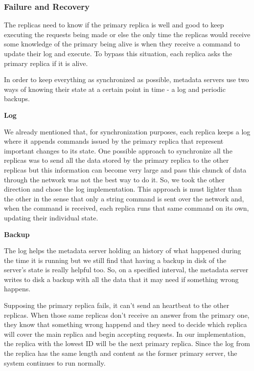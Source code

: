 \subsubsection{Failure and Recovery}

The replicas need to know if the primary replica is well and good to keep
executing the requests being made or else the only time the replicas would
receive some knowledge of the primary being alive is when they receive a
command to update their log and execute. To bypass this situation, each
replica asks the primary replica if it is alive.

In order to keep everything as synchronized as possible, metadata servers use two
ways of knowing their state at a certain point in time - a log and periodic backups.

\bigskip
\textbf{Log}
\smallskip

We already mentioned that, for synchronization purposes, each replica keeps a log
where it appends commands issued by the primary replica that represent important
changes to its state. One possible approach to synchronize all the replicas was to
send all the data stored by the primary replica to the other replicas but this
information can become very large and pass this chunck of data through the network
was not the best way to do it. So, we took the other direction and chose the log
implementation. This approach is must lighter than the other in the sense that only
a string command is sent over the network and, when the command is received, each
replica runs that same command on its own, updating their individual state.

\bigskip
\textbf{Backup}
\smallskip

The log helps the metadata server holding an history of what happened during the time
it is running but we still find that having a backup in disk of the server's state is really
helpful too. So, on a specified interval, the metadata server writes to disk a backup with
all the data that it may need if something wrong happens.

\bigskip

Supposing the primary replica fails, it can't send an heartbeat to the other replicas. When
those same replicas don't receive an answer from the primary one, they know that something
wrong happend and they need to decide which replica will cover the main replica and
begin accepting requests. In our implementation, the replica with the lowest ID will be
the next primary replica. Since the log from the replica has the same length and content as
the former primary server, the system continues to run normally.

